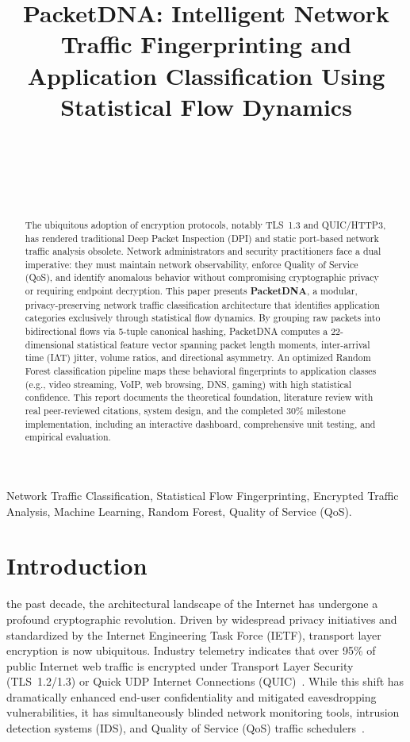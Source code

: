 \documentclass[10pt,journal,compsoc]{IEEEtran}
\title{PacketDNA: Intelligent Network Traffic Fingerprinting and Application Classification Using Statistical Flow Dynamics}
\author{
    \IEEEauthorblockN{\textbf{Arjun Tyagi}}\\
    \IEEEauthorblockA{Registration Number: 24BCE0605}\\
    \IEEEauthorblockA{School of Computer Science and Engineering (SCOPE)}\\
    \IEEEauthorblockA{Vellore Institute of Technology (VIT), Vellore}\\
    \IEEEauthorblockA{Academic Year: 2026--2027}
}
\begin{document}
\maketitle

\begin{abstract}
The ubiquitous adoption of encryption protocols, notably TLS~1.3 and QUIC/HTTP3, has rendered traditional Deep Packet Inspection (DPI) and static port-based network traffic analysis obsolete. Network administrators and security practitioners face a dual imperative: they must maintain network observability, enforce Quality of Service (QoS), and identify anomalous behavior without compromising cryptographic privacy or requiring endpoint decryption. This paper presents \textbf{PacketDNA}, a modular, privacy-preserving network traffic classification architecture that identifies application categories exclusively through statistical flow dynamics. By grouping raw packets into bidirectional flows via 5-tuple canonical hashing, PacketDNA computes a 22-dimensional statistical feature vector spanning packet length moments, inter-arrival time (IAT) jitter, volume ratios, and directional asymmetry. An optimized Random Forest classification pipeline maps these behavioral fingerprints to application classes (e.g., video streaming, VoIP, web browsing, DNS, gaming) with high statistical confidence. This report documents the theoretical foundation, literature review with real peer-reviewed citations, system design, and the completed 30\% milestone implementation, including an interactive dashboard, comprehensive unit testing, and empirical evaluation.
\end{abstract}

\begin{IEEEkeywords}
Network Traffic Classification, Statistical Flow Fingerprinting, Encrypted Traffic Analysis, Machine Learning, Random Forest, Quality of Service (QoS).
\end{IEEEkeywords}

\section{Introduction}
 the past decade, the architectural landscape of the Internet has undergone a profound cryptographic revolution. Driven by widespread privacy initiatives and standardized by the Internet Engineering Task Force (IETF), transport layer encryption is now ubiquitous. Industry telemetry indicates that over 95\% of public Internet web traffic is encrypted under Transport Layer Security (TLS~1.2/1.3) or Quick UDP Internet Connections (QUIC)~\cite{shahraki2022survey}. While this shift has dramatically enhanced end-user confidentiality and mitigated eavesdropping vulnerabilities, it has simultaneously blinded network monitoring tools, intrusion detection systems (IDS), and Quality of Service (QoS) traffic schedulers~\cite{dainotti2012issues}.
\end{document}
